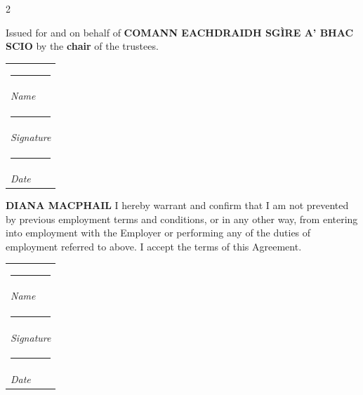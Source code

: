 \documentclass[a4paper,11pt,onecolumn ]{article}
\makeatletter
\newcommand{\namesigdate}[2][5cm]{%
  \begin{tabular}{@{}p{#1}@{}}
    #2 \\[2\normalbaselineskip] \hrule \\[0pt]
    {\small \textit{Name}} \\[2\normalbaselineskip] \hrule \\[0pt]
    {\small \textit{Signature}} \\[2\normalbaselineskip] \hrule \\[0pt]
    {\small \textit{Date}}
  \end{tabular}
}
\makeatother
\begin{document}
\begin{center}
    
\begin{multicols}{2}
\begin{center}
Issued for and on behalf of \textbf{COMANN EACHDRAIDH SGÌRE A' BHAC SCIO} by the
\textbf{chair} of the trustees.
\end{center}


\noindent
\namesigdate{}

\columnbreak

\begin{center}
\textbf{DIANA MACPHAIL}
I hereby warrant and confirm that I am not prevented by previous employment terms
and conditions, or in any other way, from entering into employment with the Employer
or performing any of the duties of employment referred to above. I accept the terms of
this Agreement.
\end{center}

\noindent
\namesigdate{}


\end{multicols}

\end{center}
\end{document}
